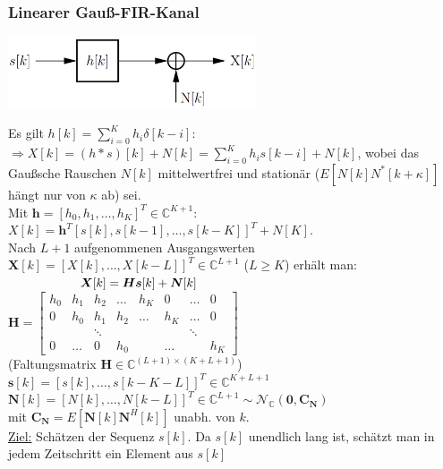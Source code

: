 \documentclass[a4paper,landscape,6pt]{article}
\newcommand{\ma}[1]{\ensuremath{\boldsymbol {#1}}}								%
\newcommand{\mat}[1]{\ensuremath{\begin{bmatrix} #1 \end{bmatrix}}}				%
\renewcommand{\vec}[1]{\ensuremath{\boldsymbol {#1}}}							%
\newcommand{\ul}[1]{\underline{#1}}
\begin{document}
\begin{multicols}{3}
\subsubsection*{Linearer Gauß-FIR-Kanal}
\begin{minipage}[h]{0.3\textwidth}
	\hspace{1 cm}
	\includegraphics[width=0.55\textwidth]{images_ssp/GauFIR}\\
\end{minipage}
Es gilt $h[k] = \sum_{i=0}^K h_i \delta[k-i]$:\\
$\Rightarrow X[k] = (h*s)[k] + N[k] = \sum_{i=0}^K h_i s[k-i] + N[k]$, wobei das Gaußsche Rauschen $N[k]$ mittelwertfrei und stationär ($E[N[k]N^*[k+\kappa]]$ hängt nur von $\kappa$ ab) sei.\\

Mit $\vec h = [h_0,h_1,\dots,h_K]^T \in \mathbb{C}^{K+1}$:\\
$X[k] = \vec h ^T [s[k], s[k-1], \dots , s[k-K]]^T + N[K]$.\\

Nach $L+1$ aufgenommenen Ausgangswerten $\vec X[k] = [X[k], \dots , X[k-L]]^T \in \mathbb{C}^{L+1}$ ($L \ge K$) erhält man:\\

$\tab \tab \vec X[k] = \ma H \vec s[k] + \vec N[k]$\\

$\ma H = \mat{h_0 & h_1 & h_2 & \dots & h_K & 0 & \dots & 0 \\
0 & h_0 & h_1 & h_2 & \dots & h_K & \dots & 0\\
 & & \ddots & & & & \ddots & {}\\
0 & \dots& 0 &h_0 & & \dots & & h_K}$\\
(Faltungsmatrix $\ma H \in \mathbb{C}^{(L+1) \times (K+L+1)}$)\\
$\vec s[k] = [s[k], \dots, s[k-K-L]]^T \in \mathbb{C}^{K+L+1}$\\
$\vec N[k] = [N[k],\dots, N[k-L]]^T \in \mathbb{C}^{L+1} \sim \mathcal{N}_{\mathbb{C}}(\vec0, \ma C_{\vec N})$\\
\tab \tab mit $\ma C_{\vec N} = E[\vec N[k] \vec N^H[k]]$ unabh. von $k$.\\

\ul{Ziel:} Schätzen der Sequenz $s[k]$. Da $s[k]$ unendlich lang ist, schätzt man in jedem Zeitschritt ein Element aus $s[k]$\\


\end{multicols}
\end{document}
